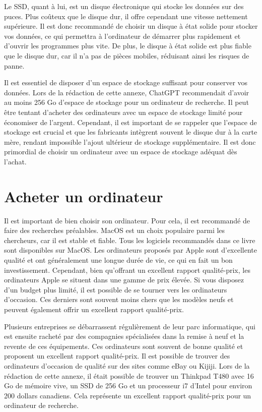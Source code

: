 \documentclass[
  letterpaper,
  DIV=11,
  numbers=noendperiod]{scrreprt}
\begin{document}
Le SSD, quant à lui, est un disque électronique qui stocke les données
sur des puces. Plus coûteux que le disque dur, il offre cependant une
vitesse nettement supérieure. Il est donc recommandé de choisir un
disque à état solide pour stocker vos données, ce qui permettra à
l'ordinateur de démarrer plus rapidement et d'ouvrir les programmes plus
vite. De plus, le disque à état solide est plus fiable que le disque
dur, car il n'a pas de pièces mobiles, réduisant ainsi les risques de
panne.

Il est essentiel de disposer d'un espace de stockage suffisant pour
conserver vos données. Lors de la rédaction de cette annexe, ChatGPT
recommendait d'avoir au moins 256 Go d'espace de stockage pour un
ordinateur de recherche. Il peut être tentant d'acheter des ordinateurs
avec un espace de stockage limité pour économiser de l'argent.
Cependant, il est important de se rappeler que l'espace de stockage est
crucial et que les fabricants intègrent souvent le disque dur à la carte
mère, rendant impossible l'ajout ultérieur de stockage supplémentaire.
Il est donc primordial de choisir un ordinateur avec un espace de
stockage adéquat dès l'achat.

\section{Acheter un ordinateur}\label{acheter-un-ordinateur}

Il est important de bien choisir son ordinateur. Pour cela, il est
recommandé de faire des recherches préalables. MacOS est un choix
populaire parmi les chercheurs, car il est stable et fiable. Tous les
logiciels recommandés dans ce livre sont disponibles sur MacOS. Les
ordinateurs proposés par Apple sont d'excellente qualité et ont
généralement une longue durée de vie, ce qui en fait un bon
investissement. Cependant, bien qu'offrant un excellent rapport
qualité-prix, les ordinateurs Apple se situent dans une gamme de prix
élevée. Si vous disposez d'un budget plus limité, il est possible de se
tourner vers les ordinateurs d'occasion. Ces derniers sont souvent moins
chers que les modèles neufs et peuvent également offrir un excellent
rapport qualité-prix.

Plusieurs entreprises se débarrassent régulièrement de leur parc
informatique, qui est ensuite racheté par des compagnies spécialisées
dans la remise à neuf et la revente de ces équipements. Ces ordinateurs
sont souvent de bonne qualité et proposent un excellent rapport
qualité-prix. Il est possible de trouver des ordinateurs d'occasion de
qualité sur des sites comme eBay ou Kijiji. Lors de la rédaction de
cette annexe, il était possible de trouver un Thinkpad T480 avec 16 Go
de mémoire vive, un SSD de 256 Go et un processeur i7 d'Intel pour
environ 200 dollars canadiens. Cela représente un excellent rapport
qualité-prix pour un ordinateur de recherche.
\end{document}
